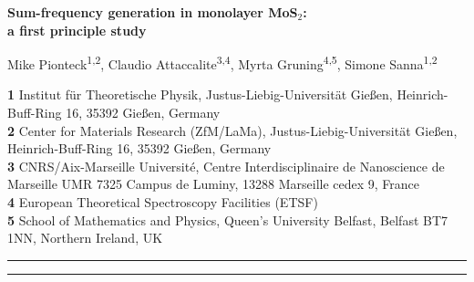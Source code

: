 \documentclass[submission, Phys]{SciPost}
\newcommand{\cinam}{CNRS/Aix-Marseille Universit\'e, Centre Interdisciplinaire de Nanoscience de Marseille UMR 7325 Campus de Luminy, 13288 Marseille cedex 9, France}
\newcommand{\etsf}{European Theoretical Spectroscopy Facilities (ETSF)}
\newcommand{\qub}{School of Mathematics and Physics, Queen's University Belfast, Belfast BT7 1NN, Northern Ireland, UK}
\newcommand{\giessen}{Institut f\"ur Theoretische Physik, Justus-Liebig-Universit\"at Gie{\ss}en, Heinrich-Buff-Ring 16, 35392 Gie{\ss}en, Germany}
\newcommand{\giessenbis}{Center for Materials Research (ZfM/LaMa), Justus-Liebig-Universit\"at Gie{\ss}en, Heinrich-Buff-Ring 16, 35392 Gie{\ss}en, Germany}
\renewcommand{\[}{\left[}
\renewcommand{\]}{\right]}
\renewcommand{\(}{\left(}
\renewcommand{\)}{\right)}
\begin{document}

\begin{center}{\Large \textbf{Sum-frequency generation in monolayer MoS$_2$: \\a first principle study}}\end{center}

\begin{center}

Mike Pionteck\textsuperscript{1,2}, Claudio Attaccalite\textsuperscript{3,4}, Myrta Gruning\textsuperscript{4,5}, Simone Sanna\textsuperscript{1,2}
\end{center}



\begin{center}
{\bf 1} \giessen
\\
{\bf 2} \giessenbis
\\
{\bf 3} \cinam
\\
{\bf 4} \etsf
\\
{\bf 5} \qub
\\
\end{center}

\date{\today}

\begin{abstract}

\end{abstract}

\vspace{10pt}
\noindent\rule{\textwidth}{1pt}
\tableofcontents\thispagestyle{fancy}
\noindent\rule{\textwidth}{1pt}
\vspace{10pt}
\end{document}
